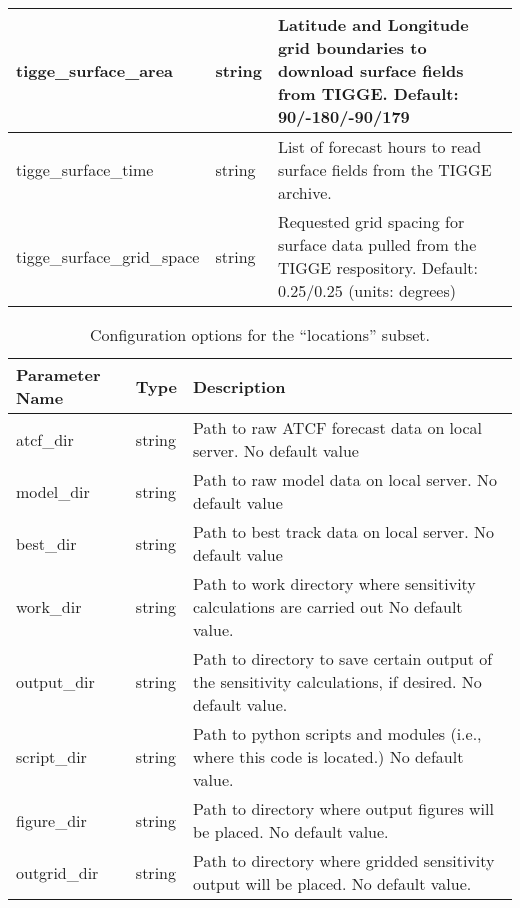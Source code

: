 \documentclass[psfig,12pt]{article}
\begin{document}
\begin{table}[H]
\begin{center}
\begin{tabular}{|p{1.75in}|p{0.5in}|p{4.00in}|}
tigge\_surface\_area & string & Latitude and Longitude grid boundaries to download surface
fields from TIGGE.  Default:  90/-180/-90/179 \\ \hline

tigge\_surface\_time & string & List of forecast hours to read surface fields from the TIGGE archive. \\ \hline

tigge\_surface\_grid\_space & string & Requested grid spacing for surface data pulled from the
TIGGE respository.  Default: 0.25/0.25 (units: degrees) \\ \hline
\end{tabular}
\end{center}
\end{table}

\begin{table}[H]
\caption{Configuration options for the ``locations'' subset.}
\begin{center}
\begin{tabular}{|p{1.60in}|p{0.5in}|p{4.15in}|}
\hline
Parameter Name & Type & Description \\ \hline\hline

atcf\_dir & string & Path to raw ATCF forecast data on local server.  No default value \\ \hline

model\_dir & string & Path to raw model data on local server.  No default value \\ \hline

best\_dir & string & Path to best track data on local server.  No default value \\ \hline

work\_dir & string & Path to work directory where sensitivity calculations are carried out
No default value. \\ \hline

output\_dir & string & Path to directory to save certain output of the sensitivity 
calculations, if desired.  No default value.  \\ \hline

script\_dir & string & Path to python scripts and modules (i.e., where this code is located.)
No default value. \\ \hline

figure\_dir & string & Path to directory where output figures will be placed.
No default value.  \\ \hline

outgrid\_dir & string & Path to directory where gridded sensitivity output will be placed.
No default value.  \\ \hline


\end{tabular}
\end{center}
\end{table}
\end{document}
